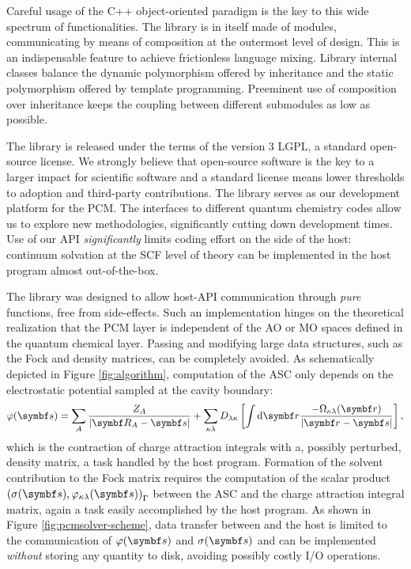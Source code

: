 Careful usage of the C++ object-oriented paradigm is the key to this
wide spectrum of functionalities. The library is in itself made of
modules, communicating by means of composition at the outermost
level of design.
This is an indispensable feature to achieve frictionless language
mixing.
Library internal classes balance the dynamic polymorphism offered by
inheritance and the static polymorphism offered by template programming.
\autocite{Alexandrescu2001-bp, Sutter2004-nt, Langr2012-js}
Preeminent use of composition over inheritance keeps the coupling
between different submodules as low as possible.\autocite{Gamma1995-fd}

The library is released under the terms of the
version 3 \gls{LGPL}, a standard open-source license.\autocite{LGPLv3}
We strongly believe that open-source software is the key to a larger
impact for scientific software and a standard license means lower
thresholds to adoption and third-party contributions.\autocite{LGPLv3}
The library serves as our development platform for the \acrshort{PCM}.
The interfaces to different quantum chemistry codes allow us to explore
new methodologies, significantly cutting down development times.
Use of our \acrshort{API} \emph{significantly} limits coding effort on the
side of the host: continuum solvation at the \acrshort{SCF} level of theory
can be implemented in the host program almost out-of-the-box.

The library was designed to allow host-\acrshort{API} communication through
\emph{pure} functions, \ie{} free from side-effects.
Such an implementation hinges on the theoretical realization that the
\acrshort{PCM} layer is independent of the \acrshort{AO} or \acrshort{MO} spaces
defined in the quantum chemical layer.
Passing and modifying large data structures, such as the Fock and
density matrices, can be completely avoided.
As schematically depicted in Figure \ref{fig:algorithm},
computation of the \acrshort{ASC} only depends on
the electrostatic potential sampled at the cavity boundary:
\begin{equation}
 \esp(\vect{s}) =
 \sum_A \frac{Z_A}{|\vect{R}_A-\vect{s}|} +  \sum_{\kappa\lambda} D_{\lambda\kappa}
 \left[\int\diff\vect{r}\frac{-\Omega_{\kappa\lambda}(\vect{r})}{|\vect{r}-\vect{s}|}\right],
\end{equation}
which is the contraction of charge attraction integrals with a, possibly
perturbed, density matrix, a task handled by the host program.
Formation of the solvent contribution to the Fock matrix requires the
computation of the scalar product
$\scalprod{\sigma(\vect{s})}{\esp_{\kappa\lambda}(\vect{s})}$
between the \acrshort{ASC} and the charge attraction integral matrix, again
a task easily accomplished by the host program.
As shown in Figure \ref{fig:pcmsolver-scheme}, data transfer between
\pcmsolver and the host is limited to the communication of
$\esp(\vect{s})$ and $\sigma(\vect{s})$ and can be implemented
\emph{without} storing any quantity to disk, avoiding possibly costly
I/O operations.

